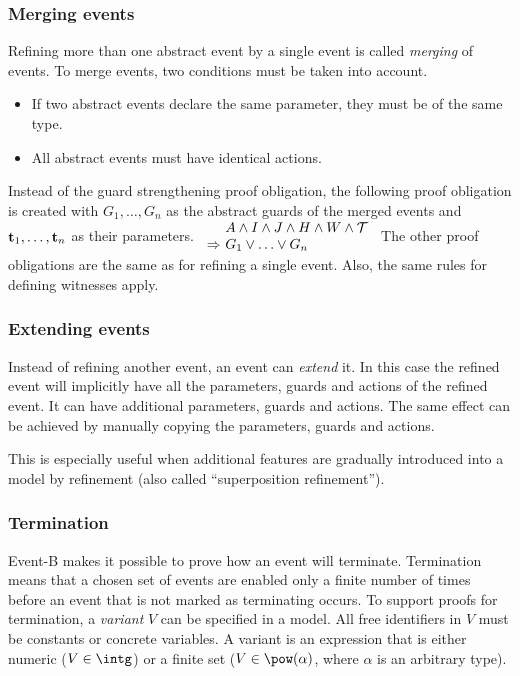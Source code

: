 \subsubsection{Merging events}
\label{merging_events}
Refining more than one abstract event by a single event is called \emph{merging} of events.
To merge events, two conditions must be taken into account.
\begin{itemize}
\item If two abstract events declare the same parameter, they must be of the same type.
\item All abstract events must have identical actions.
\end{itemize}
Instead of the guard strengthening proof obligation, the following proof obligation is
created with $G_1,\ldots,G_n$ as the abstract guards of the merged events
  and $\mathbf{t}_1,\ldots,\mathbf{t}_n$ as their parameters.
%
  {$\begin{array}{l@{\ }l}
      & A \land I \land J \land H \land W \land \concbeforeafter \\
      \limp & G_1\lor\ldots\lor G_n
    \end{array}
$}
The other proof obligations are the same as for refining a single event.
Also, the same rules for defining witnesses apply.

\subsubsection{Extending events}
\label{extending_events}
Instead of refining another event, an event can \emph{extend} it.
In this case the refined event will implicitly have all the parameters, 
 guards and actions of the refined event. It can have additional parameters,
 guards and actions. The same effect can be achieved by manually copying the parameters, guards and actions.

This is especially useful when additional features are gradually introduced
 into a model by refinement (also called ``superposition refinement'').

\subsubsection{Termination}
\label{termination}
Event-B makes it possible to prove how an event will terminate.
Termination means that a chosen set of events are enabled only a finite number
 of times before an event that is not marked as terminating occurs.
To support proofs for termination, a \emph{variant} $V$ can be specified in a model.
 All free identifiers in $V$ must be constants or concrete variables.
A variant is an expression that is either numeric 
 ($V\in\intg$) or
 a finite set ($V\in\pow(\alpha)$,
 where $\alpha$ is an arbitrary type).

